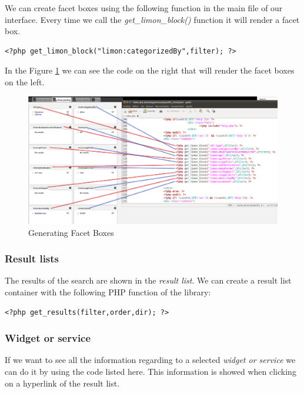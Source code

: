 We can create facet boxes using the following function in the main file of our interface. Every time we call the \textit{get\_limon\_block()} function it will render a facet box.

\begin{lstlisting}[breaklines=true, style=mono, caption="Creating facet box"]
<?php get_limon_block("limon:categorizedBy",filter); ?>
\end{lstlisting}

In the Figure \ref{fig:generatingblocks} we can see the code on the right that will render the facet boxes on the left.

\begin{figure}[h]
	\centering
	\includegraphics[width=400pt]{graphics/generatingblocks.png}
	\caption{Generating Facet Boxes}
	\label{fig:generatingblocks}
\end{figure}

\newpage
\subsubsection{Result lists}
The results of the search are shown in the \textit{result list}. We can create a result list container with the following PHP function of the library:

\begin{lstlisting}[breaklines=true, style=mono, caption="Creating result container"]
<?php get_results(filter,order,dir); ?>
\end{lstlisting}

\subsubsection{Widget or service}
If we want to see all the information regarding to a selected \textit{widget or service} we can do it by using the code listed here. This information is showed when clicking on a hyperlink of the result list.

